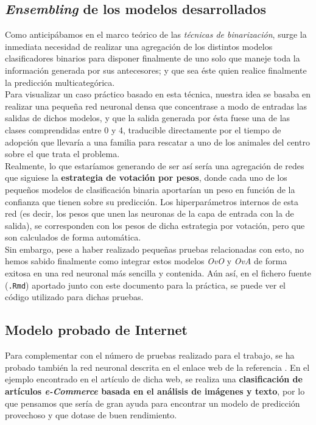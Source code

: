 \documentclass[]{article}
\begin{document}
	\subsection{\textit{Ensembling} de los modelos desarrollados}
	
		Como anticipábamos en el marco teórico de las \textit{técnicas de binarización}, surge la inmediata necesidad de realizar una agregación de los distintos modelos clasificadores binarios para disponer finalmente de uno solo que maneje toda la información generada por sus antecesores; y que sea éste quien realice finalmente la predicción multicategórica.\\
		
		Para visualizar un caso práctico basado en esta técnica, nuestra idea se basaba en realizar una pequeña red neuronal densa que concentrase a modo de entradas las salidas de dichos modelos, y que la salida generada por ésta fuese una de las clases comprendidas entre 0 y 4, traducible directamente por el tiempo de adopción que llevaría a una familia para rescatar a uno de los animales del centro sobre el que trata el problema.\\
		
		Realmente, lo que estaríamos generando de ser así sería una agregación de redes que siguiese la \textbf{estrategia de votación por pesos}, donde cada uno de los pequeños modelos de clasificación binaria aportarían un peso en función de la confianza que tienen sobre su predicción. Los hiperparámetros internos de esta red (es decir, los pesos que unen las neuronas de la capa de entrada con la de salida), se corresponden con los pesos de dicha estrategia por votación, pero que son calculados de forma automática.\\
		
		Sin embargo, pese a haber realizado pequeñas pruebas relacionadas con esto, no hemos sabido finalmente como integrar estos modelos \textit{OvO} y \textit{OvA} de forma exitosa en una red neuronal más sencilla y contenida. Aún así, en el fichero fuente (\verb|.Rmd|) aportado junto con este documento para la práctica, se puede ver el código utilizado para dichas pruebas.
		
	\subsection{Modelo probado de Internet}
	
		Para complementar con el número de pruebas realizado para el trabajo, se ha probado también la red neuronal descrita en el enlace web de la referencia \cite{cbonett-cnn}. En el ejemplo encontrado en el artículo de dicha web, se realiza una \textbf{clasificación de artículos \textit{e-Commerce} basada en el análisis de imágenes y texto}, por lo que pensamos que sería de gran ayuda para encontrar un modelo de predicción provechoso y que dotase de buen rendimiento.\\
		
\end{document}
